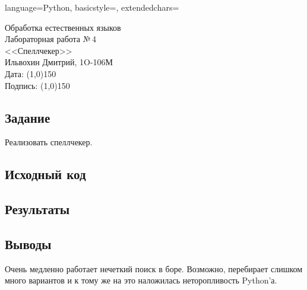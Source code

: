 \documentclass[12pt]{article}
\newcommand{\StudentName}{Ильвохин Дмитрий}
\newcommand{\Group}{1O-106М}
\newcommand{\CourseName}{Обработка естественных языков}
\newcommand{\LabNum}{4}
\newcommand{\Subject}{Спеллчекер}
\begin{document}
\lstset
{
        language=Python,
        basicstyle=\footnotesize,%
        extendedchars=\true
}

\begin{flushright}
\Large{
	\CourseName \\
	Лабораторная работа №\,\LabNum \\
	<<\Subject>> \\
  \StudentName, \Group \\
  Дата: \line(1,0){150} \\
  Подпись: \line(1,0){150} \\
}
\end{flushright}

\subsection*{Задание}
  Реализовать спеллчекер.

\subsection*{Исходный код}




\subsection*{Результаты}


\subsection*{Выводы}
Очень медленно работает нечеткий поиск в боре. Возможно, перебирает слишком много
  вариантов и к тому же на это наложилась неторопливость Python'а.
\end{document}
